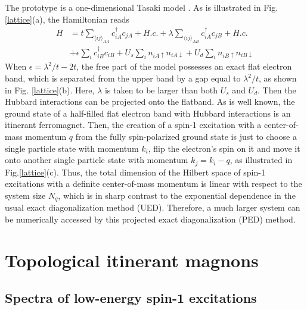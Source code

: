 \documentclass[a0,portrait]{a0poster}
\begin{document}
\begin{multicols}{2}
\par The prototype is a one-dimensional Tasaki model \cite{T_PTP1998}. As is illustrated in Fig. \ref{lattice}(a), the Hamiltonian reads
\begin{equation}\label{model}
\begin{aligned}
    H   &   =t\sum_{\langle ij\rangle_{AA}}c_{iA}^\dagger c_{jA}+H.c.+ \lambda\sum_{\langle ij\rangle_{AB}}c_{iA}^\dagger c_{jB}+H.c.\\
        &   +\epsilon\sum_i c^\dagger_{iB}c_{iB}+U_s\sum_i n_{iA\uparrow}n_{iA\downarrow}+U_d\sum_in_{iB\uparrow}n_{iB\downarrow}
\end{aligned}
\end{equation}
When $\epsilon=\lambda^2/t-2t$, the free part of the model possesses an exact flat electron band, which is separated from the upper band by a gap equal to $\lambda^2/t$, as shown in Fig. \ref{lattice}(b). Here, $\lambda$ is taken to be larger than both $U_s$ and $U_d$. Then the Hubbard interactions can be projected onto the flatband. As is well known, the ground state of a half-filled flat electron band with Hubbard interactions is an itinerant ferromagnet. Then, the creation of a spin-1 excitation with a center-of-mass momentum $q$ from the fully spin-polarized ground state is just to choose a single particle state with momentum $k_i$, flip the electron's spin on it and move it onto another single particle state with momentum $k_j=k_i-q$, as illustrated in Fig.\ref{lattice}(c). Thus, the total dimension of the Hilbert space of spin-1 excitations with a definite center-of-mass momentum is linear with respect to the system size $N_q$, which is in sharp contrast to the exponential dependence in the usual exact diagonalization method (UED). Therefore, a much larger system can be numerically accessed by this projected exact diagonalization (PED) method.

\color{DarkSlateGray} %
\section*{Topological itinerant magnons}

\subsection*{Spectra of low-energy spin-1 excitations}


\end{multicols}
\end{document}
